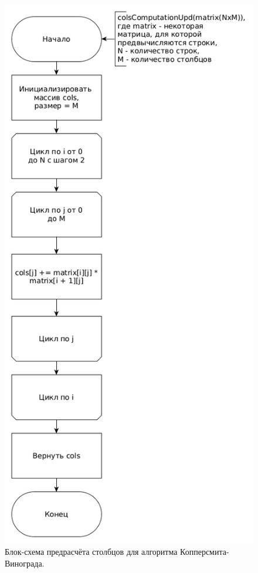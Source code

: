 \documentclass[12pt]{report}
\begin{document}
\begin{figure}
\begin{center}
\includegraphics[scale=0.4]{inc/img/colsCompUpd.png}
\captionsetup{justification=centering}
	\caption{Блок-схема предрасчёта столбцов для алгоритма Копперсмита-Винограда.}
	\label{img:colsPreComp}	
\end{center}
\end{figure}
\newpage
\end{document}
